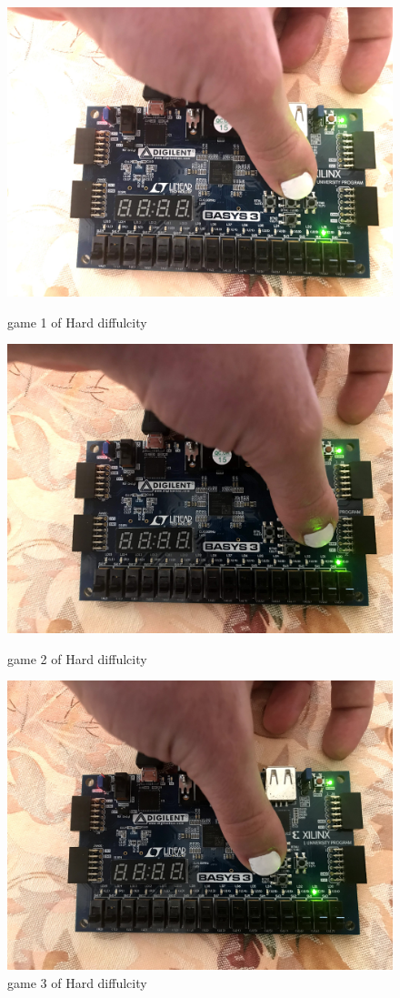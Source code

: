 \documentclass[11pt]{article}
\begin{document}
\begin{figure}[ht]\centering
	\includegraphics[width=1\textheight]{IMG_1301.JPG}
	\caption{game 1 of Hard diffulcity }
	\label{fig:sim_with_table}
	
	\includegraphics{IMG_1302.JPG}
	\caption{game 2 of Hard diffulcity }
	\label{fig:sim_with_table}
	
	\includegraphics{IMG_1303.JPG}
	\caption{game 3 of Hard diffulcity }
	\label{fig:sim_with_table}
	

\end{figure}
\end{document}
